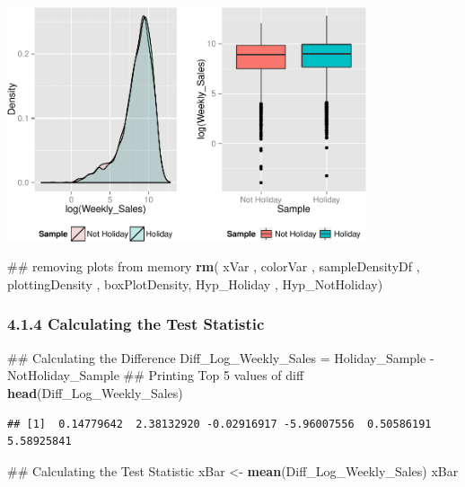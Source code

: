 \documentclass[]{article}
\newenvironment{Shaded}{\begin{snugshade}}{\end{snugshade}}
\newcommand{\KeywordTok}[1]{\textcolor[rgb]{0.13,0.29,0.53}{\textbf{{#1}}}}
\newcommand{\StringTok}[1]{\textcolor[rgb]{0.31,0.60,0.02}{{#1}}}
\newcommand{\NormalTok}[1]{{#1}}
\begin{document}
\includegraphics[width=400px]{PredictingWeeklySalesAtWalmart_files/figure-latex/visualizingTheSamplesCollected-1}

\begin{Shaded}
\begin{Highlighting}[]
\NormalTok{## removing plots from memory}
\KeywordTok{rm}\NormalTok{( xVar , colorVar , sampleDensityDf , plottingDensity , }
    \NormalTok{boxPlotDensity, Hyp_Holiday , Hyp_NotHoliday)}
\end{Highlighting}
\end{Shaded}

\subsubsection{4.1.4 Calculating the Test
Statistic}\label{calculating-the-test-statistic}

\begin{Shaded}
\begin{Highlighting}[]
\NormalTok{## Calculating the Difference}
\NormalTok{Diff_Log_Weekly_Sales =}\StringTok{ }\NormalTok{Holiday_Sample -}\StringTok{ }\NormalTok{NotHoliday_Sample}
\NormalTok{## Printing Top 5 values of diff}
\KeywordTok{head}\NormalTok{(Diff_Log_Weekly_Sales)}
\end{Highlighting}
\end{Shaded}

\begin{verbatim}
## [1]  0.14779642  2.38132920 -0.02916917 -5.96007556  0.50586191  5.58925841
\end{verbatim}

\begin{Shaded}
\begin{Highlighting}[]
\NormalTok{## Calculating the Test Statistic}
\NormalTok{xBar <-}\StringTok{ }\KeywordTok{mean}\NormalTok{(Diff_Log_Weekly_Sales)}
\NormalTok{xBar}
\end{Highlighting}
\end{Shaded}
\end{document}
